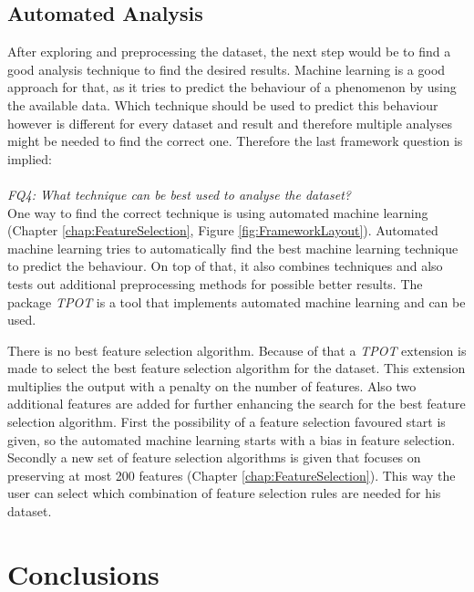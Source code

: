 \documentclass[10pt,a4paper]{report}
\begin{document}
	\section{Automated Analysis}
	\label{FIsec:Analysis Recommendations}
	
	After exploring and preprocessing the dataset, the next step would be to find a good analysis technique to find the desired results. Machine learning is a good approach for that, as it tries to predict the behaviour of a phenomenon by using the available data. Which technique should be used to predict this behaviour however is different for every dataset and result and therefore multiple analyses might be needed to find the correct one. Therefore the last framework question is implied: \\
	\\
	\emph{FQ4: What technique can be best used to analyse the dataset?} \\
	
	One way to find the correct technique is using automated machine learning (Chapter \ref{chap:FeatureSelection}, Figure \ref{fig:FrameworkLayout}). Automated machine learning tries to automatically find the best machine learning technique to predict the behaviour. On top of that, it also combines techniques and also tests out additional preprocessing methods for possible better results. The package \textit{TPOT} is a tool that implements automated machine learning and can be used. 
	
	There is no best feature selection algorithm. Because of that a \textit{TPOT} extension is made to select the best feature selection algorithm for the dataset. This extension multiplies the output with a penalty on the number of features. Also two additional features are added for further enhancing the search for the best feature selection algorithm. First the possibility of a feature selection favoured start is given, so the automated machine learning starts with a bias in feature selection. Secondly a new set of feature selection algorithms is given that focuses on preserving at most 200 features (Chapter \ref{chap:FeatureSelection}). This way the user can select which combination of feature selection rules are needed for his dataset.	
	
	\chapter{Conclusions}
	\label{chap:Conclusions}
	
\end{document}
